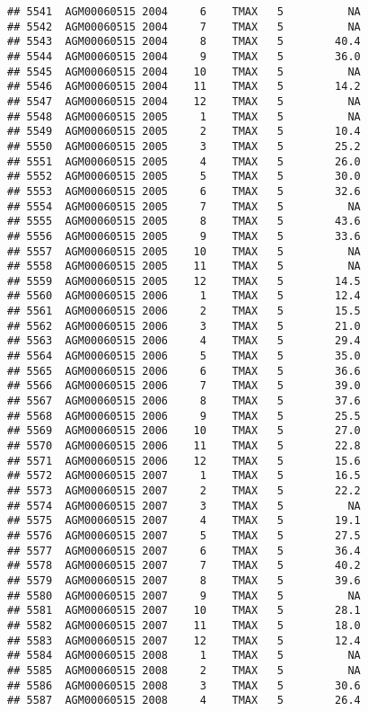 \documentclass{article}\usepackage[]{graphicx}\usepackage[]{color}
\makeatletter
\newenvironment{kframe}{%
 \def\at@end@of@kframe{}%
 \ifinner\ifhmode%
  \def\at@end@of@kframe{\end{minipage}}%
  \begin{minipage}{\columnwidth}%
 \fi\fi%
 \def\FrameCommand##1{\hskip\@totalleftmargin \hskip-\fboxsep
 \colorbox{shadecolor}{##1}\hskip-\fboxsep
     \hskip-\linewidth \hskip-\@totalleftmargin \hskip\columnwidth}%
 \MakeFramed {\advance\hsize-\width
   \@totalleftmargin\z@ \linewidth\hsize
   \@setminipage}}%
 {\par\unskip\endMakeFramed%
 \at@end@of@kframe}
\newenvironment{knitrout}{}{} %
\makeatother
\begin{document}
\begin{knitrout}
\begin{kframe}
\begin{verbatim}
## 5541  AGM00060515 2004     6    TMAX   5          NA
## 5542  AGM00060515 2004     7    TMAX   5          NA
## 5543  AGM00060515 2004     8    TMAX   5        40.4
## 5544  AGM00060515 2004     9    TMAX   5        36.0
## 5545  AGM00060515 2004    10    TMAX   5          NA
## 5546  AGM00060515 2004    11    TMAX   5        14.2
## 5547  AGM00060515 2004    12    TMAX   5          NA
## 5548  AGM00060515 2005     1    TMAX   5          NA
## 5549  AGM00060515 2005     2    TMAX   5        10.4
## 5550  AGM00060515 2005     3    TMAX   5        25.2
## 5551  AGM00060515 2005     4    TMAX   5        26.0
## 5552  AGM00060515 2005     5    TMAX   5        30.0
## 5553  AGM00060515 2005     6    TMAX   5        32.6
## 5554  AGM00060515 2005     7    TMAX   5          NA
## 5555  AGM00060515 2005     8    TMAX   5        43.6
## 5556  AGM00060515 2005     9    TMAX   5        33.6
## 5557  AGM00060515 2005    10    TMAX   5          NA
## 5558  AGM00060515 2005    11    TMAX   5          NA
## 5559  AGM00060515 2005    12    TMAX   5        14.5
## 5560  AGM00060515 2006     1    TMAX   5        12.4
## 5561  AGM00060515 2006     2    TMAX   5        15.5
## 5562  AGM00060515 2006     3    TMAX   5        21.0
## 5563  AGM00060515 2006     4    TMAX   5        29.4
## 5564  AGM00060515 2006     5    TMAX   5        35.0
## 5565  AGM00060515 2006     6    TMAX   5        36.6
## 5566  AGM00060515 2006     7    TMAX   5        39.0
## 5567  AGM00060515 2006     8    TMAX   5        37.6
## 5568  AGM00060515 2006     9    TMAX   5        25.5
## 5569  AGM00060515 2006    10    TMAX   5        27.0
## 5570  AGM00060515 2006    11    TMAX   5        22.8
## 5571  AGM00060515 2006    12    TMAX   5        15.6
## 5572  AGM00060515 2007     1    TMAX   5        16.5
## 5573  AGM00060515 2007     2    TMAX   5        22.2
## 5574  AGM00060515 2007     3    TMAX   5          NA
## 5575  AGM00060515 2007     4    TMAX   5        19.1
## 5576  AGM00060515 2007     5    TMAX   5        27.5
## 5577  AGM00060515 2007     6    TMAX   5        36.4
## 5578  AGM00060515 2007     7    TMAX   5        40.2
## 5579  AGM00060515 2007     8    TMAX   5        39.6
## 5580  AGM00060515 2007     9    TMAX   5          NA
## 5581  AGM00060515 2007    10    TMAX   5        28.1
## 5582  AGM00060515 2007    11    TMAX   5        18.0
## 5583  AGM00060515 2007    12    TMAX   5        12.4
## 5584  AGM00060515 2008     1    TMAX   5          NA
## 5585  AGM00060515 2008     2    TMAX   5          NA
## 5586  AGM00060515 2008     3    TMAX   5        30.6
## 5587  AGM00060515 2008     4    TMAX   5        26.4

\end{verbatim}
\end{kframe}
\end{knitrout}
\end{document}
